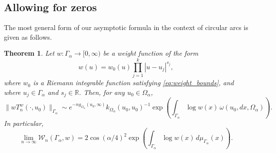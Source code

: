 \documentclass[12pt,oneside,reqno]{amsart}
\newtheorem{theoremm}[theorem]{Theorem}
\theoremstyle{definition}
\numberwithin{equation}{section}
\newcommand{\R}{{\mathbb R}}
\newcommand{\E}{{\mathsf E}}
\newcommand{\cW}{{\mathcal{W}}}
\renewcommand{\Cap}{\operatorname{Cap}}
\begin{document}
%

\subsection{Allowing for zeros}
The most general form of our asymptotic formula in the context of circular arcs is given as follows.

\begin{theoremm}
	Let $w:\Gamma_\alpha\rightarrow [0,\infty)$ be a weight function of the form
	\begin{equation}
	w(u) = w_0(u)\prod_{j=1}^{k}|u-u_j|^{s_j},
	\end{equation}
	where $w_0$ is a Riemann integrable function satisfying \eqref{eq:weight_bounds}, and where $u_j\in \Gamma_\alpha$ and $s_j\in \R$. Then, for any $u_0\in \Omega_\alpha$,
	\begin{equation}
		\|w T_n^{w}(\cdot,u_0)\|_{\Gamma_\alpha}\sim  e^{-ng_{\Omega_\alpha}(u_0,\infty)}k_{\Omega_\alpha}(u_0,u_0)^{-1}\exp\left(\int_{\Gamma_\alpha} \log w(x)\,\omega(u_0,dx,\Omega_{\alpha})\right).
	\end{equation}
	In particular,
	\begin{equation}
		\lim_{n\rightarrow \infty}\cW_n(\Gamma_\alpha,w)= 2\cos(\alpha/4)^2\exp\left(\int_{\Gamma_\alpha} \log w(x)\,d\mu_{\Gamma_\alpha}(x)\right).
		\label{eq:chebyshev_norm_general_formula}
	\end{equation}
	\label{thm:main_norm_asymptotics}
\end{theoremm}
\end{document}
